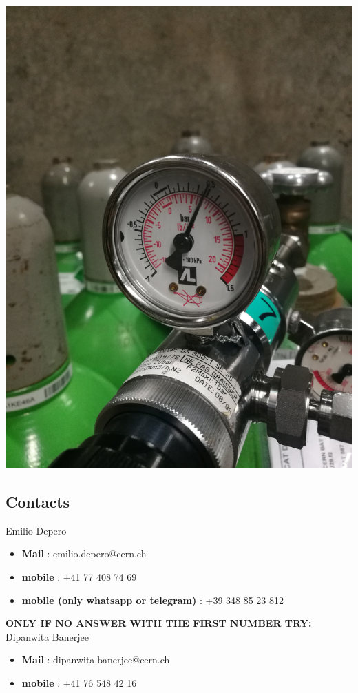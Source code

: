 \documentclass[a4paper]{article}
\begin{document}
\begin{enumerate}
\begin{center}
\includegraphics[width=.9\linewidth]{inlet2.jpg}
\end{center}
\end{enumerate}

\subsection{Contacts}
\label{sec:orge84d9ea}
Emilio Depero
\begin{itemize}
\item \textbf{Mail}  : emilio.depero@cern.ch
\item \textbf{mobile} : +41 77 408 74 69
\item \textbf{mobile (only whatsapp or telegram)} :  +39 348 85 23 812
\end{itemize}

\textbf{ONLY IF NO ANSWER WITH THE FIRST NUMBER TRY:}
Dipanwita Banerjee
\begin{itemize}
\item \textbf{Mail}  : dipanwita.banerjee@cern.ch
\item \textbf{mobile} : +41 76 548 42 16
\end{itemize}
\end{document}
